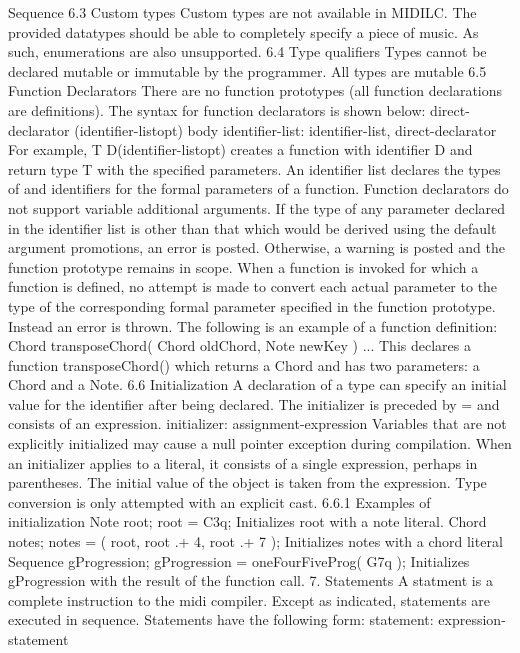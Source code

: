 \documentclass[12pt,A4]{book}
\begin{document}
    Sequence
6.3 Custom types
Custom types are not available in MIDILC.  The provided datatypes should be able to completely specify a piece of music. As such, enumerations are also unsupported.
6.4 Type qualifiers
Types cannot be declared mutable or immutable by the programmer.  All types are mutable
6.5 Function Declarators
There are no function prototypes (all function declarations are definitions).  The syntax for function declarators is shown below:
direct-declarator (identifier-listopt) { body }
identifier-list:
identifier-list, direct-declarator
For example,
T D(identifier-listopt)
creates a function with identifier D and return type T with the specified parameters. An identifier list declares the types of and identifiers for the formal parameters of a function.
Function declarators do not support variable additional arguments.  
If the type of any parameter declared in the identifier list is other than that which would be derived using the default argument promotions, an error is posted.  Otherwise, a warning is posted and the function prototype remains in scope.
When a function is invoked for which a function is defined, no attempt is made to convert each actual parameter to the type of the corresponding formal parameter specified in the function prototype. Instead an error is thrown.  
The following is an example of a function definition:
Chord transposeChord( Chord oldChord, Note newKey ) { ... }
This declares a function transposeChord() which returns a Chord and has two parameters: a Chord and a Note.  
6.6 Initialization
A declaration of a type can specify an initial value for the identifier after being declared.  The initializer is preceded by = and consists of an expression.
initializer:    assignment-expression
Variables that are not explicitly initialized may cause a null pointer exception during compilation. When an initializer applies to a literal, it consists of a single expression, perhaps in parentheses.  The initial value of the object is taken from the expression.  Type conversion is only attempted with an explicit cast.
6.6.1 Examples of initialization
Note root;
root = C3q;
Initializes root with a note literal.
Chord notes;
notes = ( root, root .+ 4, root .+ 7 );
Initializes notes with a chord literal
Sequence gProgression;
gProgression = oneFourFiveProg( G7q );
Initializes gProgression with the result of the function call.
7. Statements
A statment is a complete instruction to the midi compiler. Except as indicated, statements are executed in sequence.  Statements have the following form:
statement:        expression-statement
\end{document}
